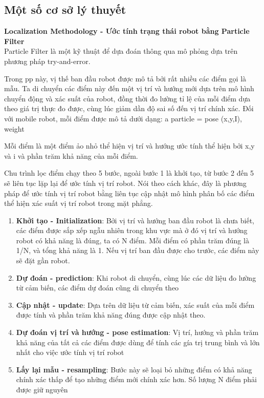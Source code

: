 \subsection{Một số cơ sở lý thuyết}
\textbf{Localization Methodology -  Ước tính trạng thái robot bằng Particle Filter }\\
Particle Filter là  một kỹ thuật để dựa đoán thông  qua mô phỏng dựa trên phương pháp try-and-error.  

Trong  pp  này,  vị thế ban đầu robot được mô tả  bởi rất nhiều các điểm gọi là mẫu.  Ta  di chuyển các điểm này  đến  một vị trí và hướng mới  dựa trên mô hình  chuyển động và xác suất của  robot,  đồng thời đo  lường  tỉ lệ  của  mỗi điểm dựa theo  giá  trị thực  đo được,  cùng lúc giảm dần  độ sai  số đến vị trí  chính xác.  Đối với mobile robot,  mỗi điểm được mô tả dưới dạng:
a  particle =  pose (x,y,I), weight

Mỗi  điểm là một điểm  ảo nhỏ  thể hiện vị trí và hướng ước  tính  thể hiện bởi x,y  và  i  và phần trăm khả năng  của mỗi điểm.

Chu trình  lọc điểm chạy theo 5  bước, ngoài bước 1  là khởi tạo,  từ bước 2  đến 5  sẽ liên tục lặp lại để ước tính vị trí robot.  Nói theo cách khác,  đây là phương pháp để ước  tính vị trí robot  bằng liên tục cập nhật mô hình phân bố các điểm  thể  hiện xác suất  vị  trí robot  trong mặt phẳng.
\begin{enumerate}
	\item \textbf{Khởi tạo  -  Initialization}:
	Bởi vị trí và hướng ban đầu  robot là  chưa biết,  các điểm được sắp xếp ngẫu nhiên trong khu vực  mà ở đó vị  trí và hướng robot có khả năng là đúng,  ta có N  điểm.  Mỗi điểm  có  phần trăm đúng là 1/N,  và  tổng  khả năng là  1.  Nếu vị trí ban đầu được cho trước,  các  điểm này sẽ đặt gần robot.
	\item \textbf{Dự đoán -  prediction}:
	Khi robot di chuyển,  cùng lúc  các dữ liệu đo lường từ cảm  biến,  các điểm dự đoán cũng di chuyển theo
	\item \textbf{Cập nhật -  update}:
	Dựa trên  dữ liệu từ cảm biến,  xác suất của mỗi điểm được  tính và phần trăm khả năng đúng được cập nhật theo.
	\item \textbf{Dự đoán  vị trí và  hướng - pose estimation}:
	Vị trí,  hướng và  phần trăm khả năng  của  tất cả  các điểm được dùng để tính các  gía trị trung bình và lớn  nhất cho việc ước tính vị trí robot
	\item \textbf{Lấy lại mẫu  -  resampling}:
	Bước này sẽ loại bỏ những điểm có khả năng  chính xác thấp  để tạo những  điểm mới  chính xác hơn. Số lượng N  điểm phải được giữ nguyên
\end{enumerate}

